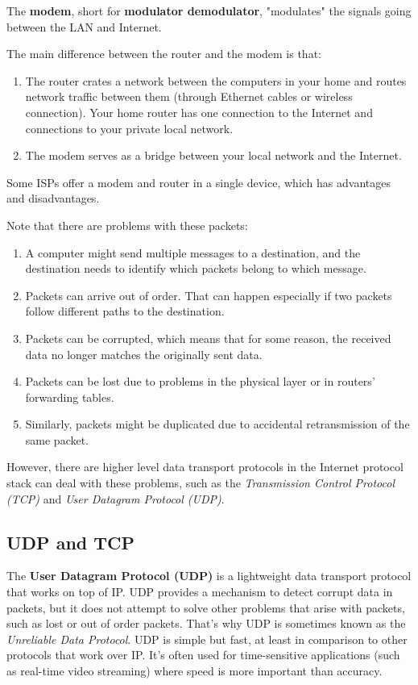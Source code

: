 \documentclass{article}
\begin{document}
  \begin{definition}
  The \textbf{modem}, short for \textbf{modulator demodulator}, "modulates" the signals going between the LAN and Internet. 
  \end{definition}

  The main difference between the router and the modem is that: 
  \begin{enumerate}
      \item The router crates a network between the computers in your home and routes network traffic between them (through Ethernet cables or wireless connection). Your home router has one connection to the Internet and connections to your private local network. 
      \item The modem serves as a bridge between your local network and the Internet. 
  \end{enumerate}
  Some ISPs offer a modem and router in a single device, which has advantages and disadvantages. 

  Note that there are problems with these packets: 
  \begin{enumerate}
      \item A computer might send multiple messages to a destination, and the destination needs to identify which packets belong to which message.
      \item Packets can arrive out of order. That can happen especially if two packets follow different paths to the destination.
      \item Packets can be corrupted, which means that for some reason, the received data no longer matches the originally sent data.
      \item Packets can be lost due to problems in the physical layer or in routers' forwarding tables.
      \item Similarly, packets might be duplicated due to accidental retransmission of the same packet.
  \end{enumerate}

  However, there are higher level data transport protocols in the Internet protocol stack can deal with these problems, such as the \textit{Transmission Control Protocol (TCP)} and \textit{User Datagram Protocol (UDP)}. 

  \subsection{UDP and TCP}

  The \textbf{User Datagram Protocol (UDP)} is a lightweight data transport protocol that works on top of IP. UDP provides a mechanism to detect corrupt data in packets, but it does not attempt to solve other problems that arise with packets, such as lost or out of order packets. That's why UDP is sometimes known as the \textit{Unreliable Data Protocol}. UDP is simple but fast, at least in comparison to other protocols that work over IP. It's often used for time-sensitive applications (such as real-time video streaming) where speed is more important than accuracy.
\end{document}
